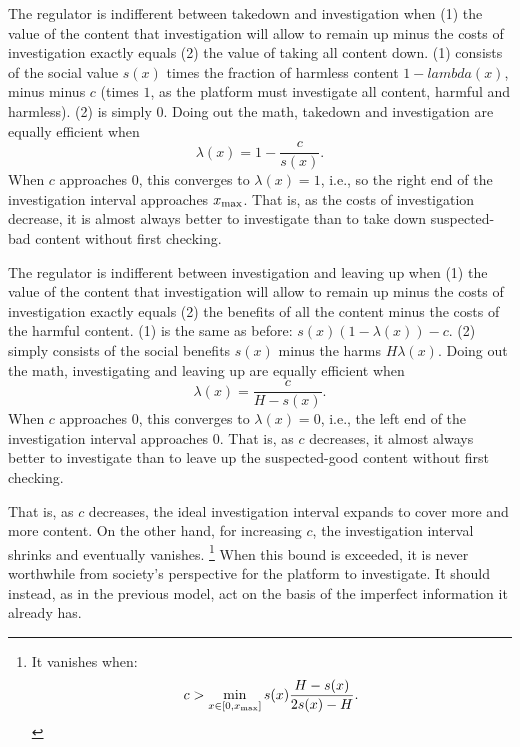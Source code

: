 
The regulator is indifferent between takedown and investigation when (1) the value of the content that investigation will allow to remain up minus the costs of investigation exactly equals (2) the value of taking all content down. (1) consists of the social value $s(x)$ times the fraction of harmless content $1 - lambda(x)$,  minus minus $c$ (times $1$, as the platform must investigate all content, harmful and harmless). (2) is simply $0$. Doing out the math, takedown and investigation are equally efficient when 
 \begin{equation*}\lambda(x) = 1 - \frac{c}{s(x)}.\end{equation*} When $c$ approaches $0$, this converges to $\lambda(x) = 1$, i.e., so the right end of the investigation interval approaches $x_{\text{max}}$. That is, as the costs of investigation decrease, it is almost always better to investigate than to take down suspected-bad content without first checking. 

The regulator is indifferent between investigation and leaving up when (1) the value of the content that investigation will allow to remain up minus the costs of investigation exactly equals (2) the benefits of all the content minus the costs of the harmful content. (1) is the same as before: $s(x)(1 - \lambda(x)) - c$. (2) simply consists of the social benefits $s(x)$ minus the harms $H\lambda(x)$. Doing out the math, investigating and leaving up are equally efficient when 
\begin{equation*}\lambda(x) = \frac{c}{H - s(x)}.\end{equation*} When $c$ approaches $0$, this converges to $\lambda(x) = 0$, i.e., the left end of the investigation interval approaches $0$. That is, as $c$ decreases, it almost always better to investigate than to leave up the suspected-good content without first checking. 

That is, as $c$ decreases, the ideal investigation interval expands to cover more and more content. On the other hand, for increasing $c$, the investigation interval shrinks and eventually vanishes. \footnote{It vanishes when:
\begin{equation*}
c > \min_{x \in [0, x_{\text{max}}]} s(x)\frac{H - s(x)}{2s(x) - H}.
\end{equation*}}
When this bound is exceeded, it is never worthwhile from society's perspective for the platform to investigate. It should instead, as in the previous model, act on the basis of the imperfect information it already has.

